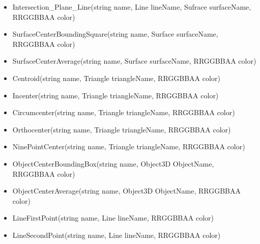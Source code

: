 \begin{itemize}
		\item Intersection\_Plane\_Line(string name, Line lineName, Sufrace surfaceName, RRGGBBAA color)


		\item SurfaceCenterBoundingSquare(string name, Surface surfaceName, RRGGBBAA color) 

		\item SurfaceCenterAverage(string name, Surface surfaceName, RRGGBBAA color) %

		\item Centroid(string name, Triangle triangleName, RRGGBBAA color)
		
		\item Incenter(string name, Triangle triangleName, RRGGBBAA color)
		
		\item Circumcenter(string name, Triangle triangleName, RRGGBBAA color)
		
		\item Orthocenter(string name, Triangle triangleName, RRGGBBAA color)
		
		\item NinePointCenter(string name, Triangle triangleName, RRGGBBAA color)

		\item ObjectCenterBoundingBox(string name, Object3D ObjectName, RRGGBBAA color) 

		\item ObjectCenterAverage(string name, Object3D ObjectName, RRGGBBAA color) 

		\item LineFirstPoint(string name, Line lineName, RRGGBBAA color)
		
		\item LineSecondPoint(string name, Line lineName, RRGGBBAA color)

\end{itemize}

